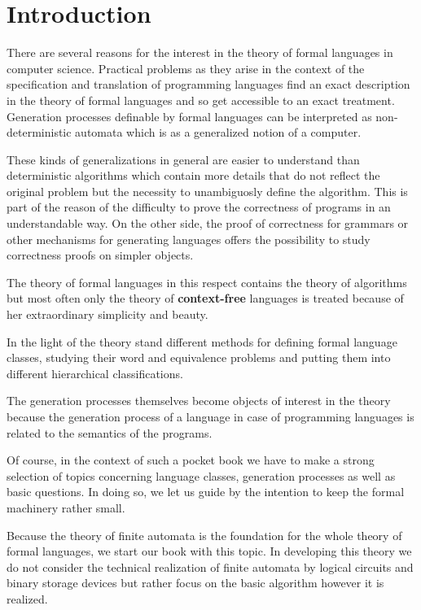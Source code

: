\chapter*{Introduction}

There are several reasons for the interest in the theory of formal languages in
computer science. Practical problems as they arise in the context of the
specification and translation of programming languages find an exact
description in the theory of formal languages and so get accessible to an exact
treatment. Generation processes definable by formal languages can be interpreted as 
non-deterministic automata which is as a generalized notion of a computer.

These kinds of generalizations in general are easier to understand than
deterministic algorithms which contain more details that do not reflect the
original problem but the necessity to unambiguosly define the algorithm. This is
part of the reason of the difficulty to prove the correctness of programs in
an understandable way. On the other side, the proof of correctness for grammars
or other mechanisms for generating languages offers the possibility to study correctness proofs
on simpler objects.

The theory of formal languages in this respect contains the theory of
algorithms but most often only the theory of {\bf context-free} languages is
treated because of her extraordinary simplicity and beauty.

In the light of the theory stand different methods for defining
formal language classes, studying their word and equivalence problems and
putting them into different hierarchical classifications.

The generation processes themselves become objects of interest in the theory
because the generation process of a language in case of programming languages
is related to the semantics of the programs.

Of course, in the context of such a pocket book we have to make a strong
selection of topics concerning language classes, generation processes as well as
basic questions. In doing so, we let us guide by the intention to keep the
formal machinery rather small.

Because the theory of finite automata is the foundation for the whole theory of
formal languages, we start our book with this topic. In developing this theory
we do not consider the technical realization of finite automata by logical
circuits and binary storage devices but rather focus on the basic algorithm however it is realized.
 
